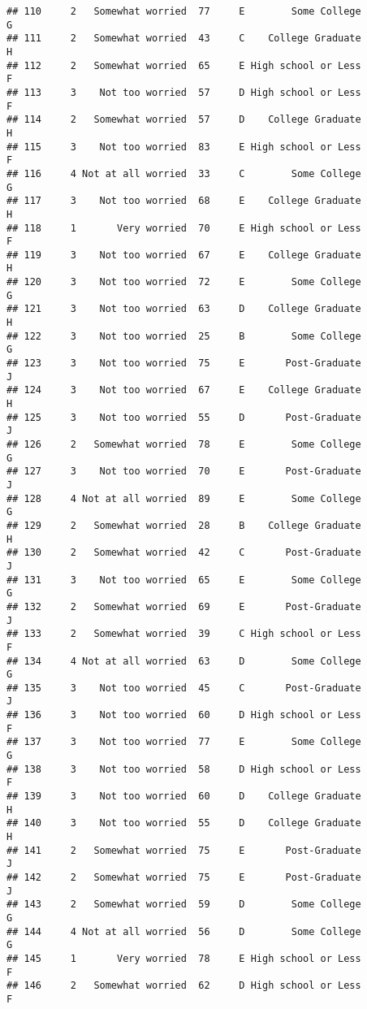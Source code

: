 \documentclass[
]{article}
\begin{document}
\begin{verbatim}
## 110     2   Somewhat worried  77     E        Some College         G
## 111     2   Somewhat worried  43     C    College Graduate         H
## 112     2   Somewhat worried  65     E High school or Less         F
## 113     3    Not too worried  57     D High school or Less         F
## 114     2   Somewhat worried  57     D    College Graduate         H
## 115     3    Not too worried  83     E High school or Less         F
## 116     4 Not at all worried  33     C        Some College         G
## 117     3    Not too worried  68     E    College Graduate         H
## 118     1       Very worried  70     E High school or Less         F
## 119     3    Not too worried  67     E    College Graduate         H
## 120     3    Not too worried  72     E        Some College         G
## 121     3    Not too worried  63     D    College Graduate         H
## 122     3    Not too worried  25     B        Some College         G
## 123     3    Not too worried  75     E       Post-Graduate         J
## 124     3    Not too worried  67     E    College Graduate         H
## 125     3    Not too worried  55     D       Post-Graduate         J
## 126     2   Somewhat worried  78     E        Some College         G
## 127     3    Not too worried  70     E       Post-Graduate         J
## 128     4 Not at all worried  89     E        Some College         G
## 129     2   Somewhat worried  28     B    College Graduate         H
## 130     2   Somewhat worried  42     C       Post-Graduate         J
## 131     3    Not too worried  65     E        Some College         G
## 132     2   Somewhat worried  69     E       Post-Graduate         J
## 133     2   Somewhat worried  39     C High school or Less         F
## 134     4 Not at all worried  63     D        Some College         G
## 135     3    Not too worried  45     C       Post-Graduate         J
## 136     3    Not too worried  60     D High school or Less         F
## 137     3    Not too worried  77     E        Some College         G
## 138     3    Not too worried  58     D High school or Less         F
## 139     3    Not too worried  60     D    College Graduate         H
## 140     3    Not too worried  55     D    College Graduate         H
## 141     2   Somewhat worried  75     E       Post-Graduate         J
## 142     2   Somewhat worried  75     E       Post-Graduate         J
## 143     2   Somewhat worried  59     D        Some College         G
## 144     4 Not at all worried  56     D        Some College         G
## 145     1       Very worried  78     E High school or Less         F
## 146     2   Somewhat worried  62     D High school or Less         F

\end{verbatim}
\end{document}
